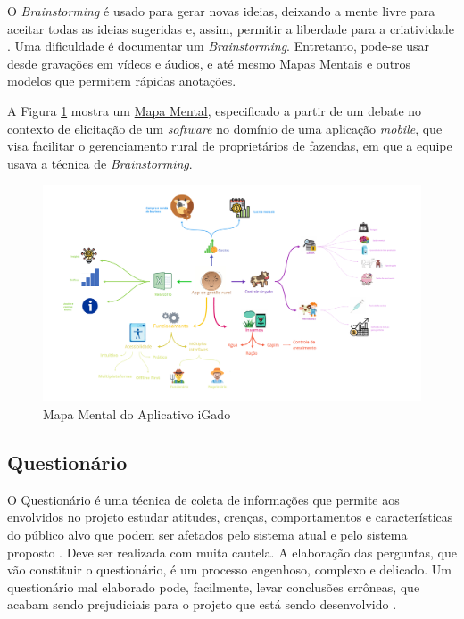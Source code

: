 O \textit{Brainstorming} é usado para gerar novas ideias, deixando a mente livre para aceitar todas as ideias sugeridas e, assim, permitir a liberdade para a criatividade \cite{batista2003taxonomia}. Uma dificuldade é documentar um \textit{Brainstorming}. Entretanto, pode-se usar desde gravações em vídeos e áudios, e até mesmo Mapas Mentais e outros modelos que permitem rápidas anotações.

A Figura \ref{fig:mind_map} mostra um \href{https://unbarqdsw.github.io/2020.1_G13_iGado/#/docs/Product/MindMap}{Mapa Mental}, especificado a partir de um debate no contexto de elicitação de um \textit{software} no domínio de uma aplicação \textit{mobile}, que visa facilitar o gerenciamento rural de proprietários de fazendas, em que a equipe usava a técnica de \textit{Brainstorming}.

\begin{figure}[H]
    \begin{center}
        \caption{Mapa Mental do Aplicativo iGado}
        \label{fig:mind_map}
        \includegraphics[scale=0.15]{figuras/Embasamento/MindMap.png}
    \end{center}
\end{figure}

\subsection{Questionário}

\label{sec:questionario}

O Questionário é uma técnica de coleta de informações que permite aos envolvidos no projeto estudar atitudes, crenças, comportamentos e características do público alvo que podem ser afetados pelo sistema atual e pelo sistema proposto \cite{kendall1992systems}. Deve ser realizada com muita cautela. A elaboração das perguntas, que vão constituir o questionário, é um processo engenhoso, complexo e delicado. Um questionário mal elaborado pode, facilmente, levar conclusões errôneas, que acabam sendo prejudiciais para o projeto que está sendo desenvolvido \cite{bastosjunior}.

